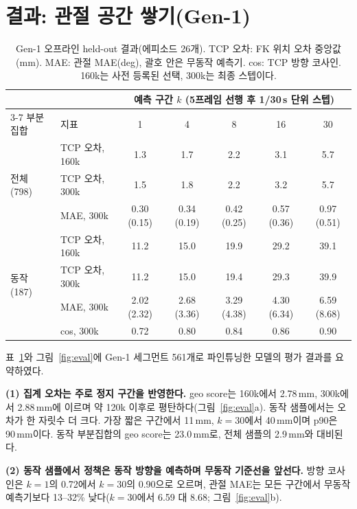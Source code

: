 \documentclass[conference,10pt]{IEEEtran}
\newcommand{\mm}{\,mm\xspace}
\begin{document}
\section{결과: 관절 공간 쌓기(Gen-1)}\label{sec:res1}
\begin{table}[t]
\centering\footnotesize
\setlength{\tabcolsep}{7pt}
\caption{Gen-1 오프라인 held-out 결과(에피소드 26개). TCP 오차: FK 위치 오차 중앙값(mm). MAE: 관절 MAE(deg), 괄호 안은 무동작
예측기. cos: TCP 방향 코사인. 160k는 사전 등록된 선택, 300k는 최종 스텝이다.}
\label{tab:results}
\begin{tabular}{@{}llccccc@{}}
\toprule
 & & \multicolumn{5}{c}{예측 구간 $k$ (5프레임 선행 후 1/30\,s 단위 스텝)} \\
\cmidrule(l){3-7}
부분집합 & 지표 & 1 & 4 & 8 & 16 & 30 \\
\midrule
\multirow{3}{*}{전체 (798)} & TCP 오차, 160k & 1.3 & 1.7 & 2.2 & 3.1 & 5.7 \\
 & TCP 오차, 300k & 1.5 & 1.8 & 2.2 & 3.2 & 5.7 \\
 & MAE, 300k & 0.30 (0.15) & 0.34 (0.19) & 0.42 (0.25) & 0.57 (0.36) & 0.97 (0.51) \\
\midrule
\multirow{4}{*}{동작 (187)} & TCP 오차, 160k & 11.2 & 15.0 & 19.9 & 29.2 & 39.1 \\
 & TCP 오차, 300k & 11.2 & 15.0 & 19.4 & 29.3 & 39.9 \\
 & MAE, 300k & 2.02 (2.32) & 2.68 (3.36) & 3.29 (4.38) & 4.30 (6.34) & 6.59 (8.68) \\
 & cos, 300k & 0.72 & 0.80 & 0.84 & 0.86 & 0.90 \\
\bottomrule
\end{tabular}
\end{table}

표~\ref{tab:results}와 그림~\ref{fig:eval}에 Gen-1 세그먼트 561개로 파인튜닝한 모델의 평가 결과를 요약하였다.

\textbf{(1) 집계 오차는 주로 정지 구간을 반영한다.} geo score는 160k에서 2.78\mm, 300k에서 2.88\mm{}에 이르며 약 120k 이후로
평탄하다(그림~\ref{fig:eval}a). 동작 샘플에서는 오차가 한 자릿수 더 크다. 가장 짧은 구간에서 11\mm, $k{=}30$에서 40\mm{}이며 p90은
90\mm{}이다. 동작 부분집합의 geo score는 23.0\mm{}로, 전체 샘플의 2.9\mm{}와 대비된다.

\textbf{(2) 동작 샘플에서 정책은 동작 방향을 예측하며 무동작 기준선을 앞선다.} 방향 코사인은 $k{=}1$의 0.72에서 $k{=}30$의 0.90으로
오르며, 관절 MAE는 모든 구간에서 무동작 예측기보다 13--32\% 낮다($k{=}30$에서 6.59 대 8.68\textdegree{}; 그림~\ref{fig:eval}b).
\end{document}

